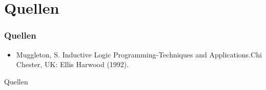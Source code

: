 \section{Quellen}
\begin{frame}
    \frametitle{Quellen}
    \begin{itemize}
        \item Muggleton, S. \glqq Inductive Logic Programming-Techniques and Applications.\grqq  Chi Chester, UK: Ellis Harwood (1992).
    \end{itemize}
\end{frame}

\begin{frame}[allowframebreaks]{Quellen}
    \raggedright
    \nocite{*}
    
    
\end{frame}
